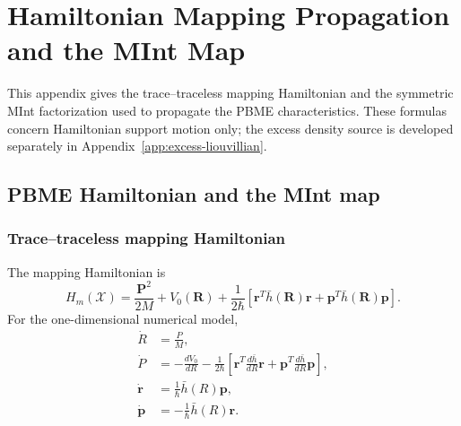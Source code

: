 \documentclass[
  11pt,
  letterpaper,
  onehalfspacing,
  normalmargins,
  equalmargins,
  oneside
]{ut-thesis}
\begin{document}
\chapter[Hamiltonian Mapping Propagation]{Hamiltonian Mapping Propagation and the MInt Map}
\label{app:hamiltonian-mapping-propagation}

This appendix gives the trace--traceless mapping Hamiltonian and the symmetric
MInt factorization used to propagate the PBME characteristics. These formulas
concern Hamiltonian support motion only; the excess density source is developed
separately in Appendix~\ref{app:excess-liouvillian}.

\section{PBME Hamiltonian and the MInt map}
\label{appsec:mint-derivation}

\subsection{Trace--traceless mapping Hamiltonian}
\label{appsubsec:mint-hamiltonian}

The mapping Hamiltonian is
\begin{equation}
H_m(\boldsymbol{\mathcal X})
=
\frac{\mathbf P^2}{2M}
+
V_0(\mathbf R)
+
\frac{1}{2\hbar}
\left[
\mathbf r^T\bar h(\mathbf R)\mathbf r
+
\mathbf p^T\bar h(\mathbf R)\mathbf p
\right].
\label{appeq:appendix-mapping-hamiltonian}
\end{equation}
For the one-dimensional numerical model,
\begin{align}
\dot R
&=
\frac{P}{M},
\\
\dot P
&=
-\frac{dV_0}{dR}
-
\frac{1}{2\hbar}
\left[
\mathbf r^T
\frac{d\bar h}{dR}
\mathbf r
+
\mathbf p^T
\frac{d\bar h}{dR}
\mathbf p
\right],
\\
\dot{\mathbf r}
&=
\frac{1}{\hbar}\bar h(R)\mathbf p,
\\
\dot{\mathbf p}
&=
-\frac{1}{\hbar}\bar h(R)\mathbf r.
\end{align}
\end{document}
